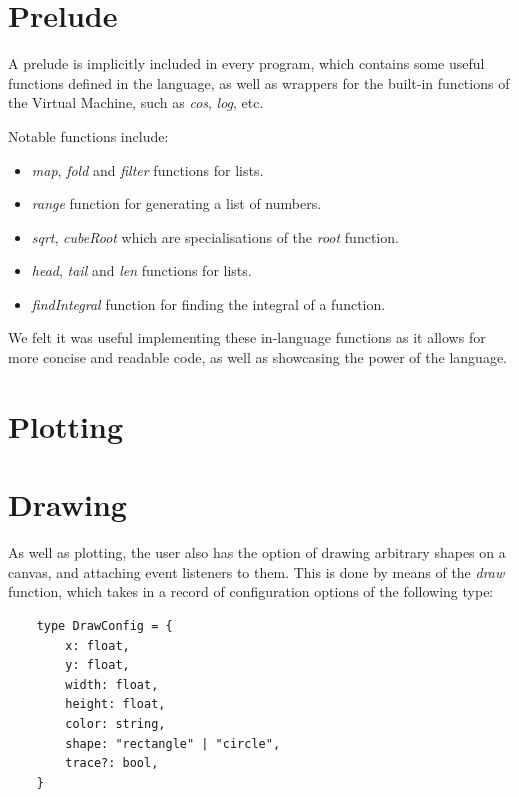 


\section{Prelude}\label{sec:prelude}

A prelude is implicitly included in every program, which contains some useful functions defined in the language, as 
well as wrappers for the built-in functions of the Virtual Machine, such as \textit{cos}, \textit{log}, etc.

Notable functions include:

\begin{itemize}
    \item \textit{map}, \textit{fold} and \textit{filter} functions for lists.
    \item \textit{range} function for generating a list of numbers.
    \item \textit{sqrt}, \textit{cubeRoot} which are specialisations of the \textit{root} function.
    \item \textit{head}, \textit{tail} and \textit{len} functions for lists.
    \item \textit{findIntegral} function for finding the integral of a function.
\end{itemize}

We felt it was useful implementing these in-language functions as it allows for more concise and readable code, as
well as showcasing the power of the language.

\section{Plotting}\label{sec:plotting}



\section{Drawing}\label{sec:drawing}

As well as plotting, the user also has the option of drawing arbitrary shapes on a canvas, and attaching event 
listeners to them.
This is done by means of the \textit{draw} function, which takes in a record of configuration options of the following
type:

\begin{verbatim}
    type DrawConfig = {
        x: float,
        y: float,
        width: float,
        height: float,
        color: string,
        shape: "rectangle" | "circle",
        trace?: bool, 
    }
\end{verbatim}

